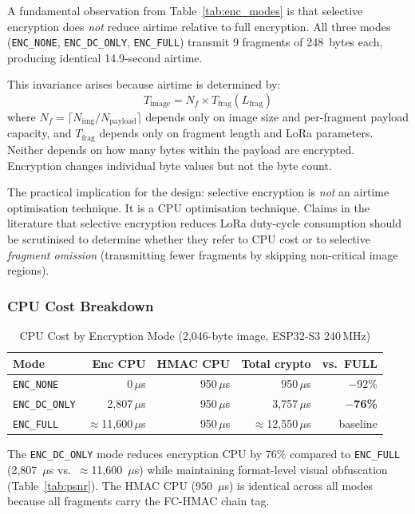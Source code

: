 \documentclass[journal]{IEEEtran}
\begin{document}
A fundamental observation from Table~\ref{tab:enc_modes} is that selective
encryption does \emph{not} reduce airtime relative to full encryption.  All
three modes (\texttt{ENC\_NONE}, \texttt{ENC\_DC\_ONLY}, \texttt{ENC\_FULL})
transmit 9 fragments of 248~bytes each, producing identical 14.9-second airtime.

This invariance arises because airtime is determined by:
\begin{equation}
  T_{\text{image}} = N_f \times T_{\text{frag}}(L_{\text{frag}})
  \label{eq:airtime}
\end{equation}
where $N_f = \lceil N_{\text{img}} / N_{\text{payload}} \rceil$ depends only
on image size and per-fragment payload capacity, and $T_{\text{frag}}$ depends
only on fragment length and LoRa parameters.  Neither depends on how many bytes
within the payload are encrypted.  Encryption changes individual byte values
but not the byte count.

The practical implication for the design: selective encryption is \emph{not}
an airtime optimisation technique.  It is a CPU optimisation technique.
Claims in the literature that selective encryption reduces LoRa duty-cycle
consumption should be scrutinised to determine whether they refer to CPU
cost or to selective \emph{fragment omission} (transmitting fewer fragments
by skipping non-critical image regions).

\subsubsection{CPU Cost Breakdown}

\begin{table}[ht]
\centering
\caption{CPU Cost by Encryption Mode (2{,}046-byte image, ESP32-S3 240\,MHz)}
\label{tab:cpu_savings}
\begin{tabular}{lrrrr}
\toprule
Mode & Enc CPU & HMAC CPU & Total crypto & vs.\ FULL \\
\midrule
\texttt{ENC\_NONE}    & 0\,$\mu$s & 950\,$\mu$s & 950\,$\mu$s & $-$92\% \\
\texttt{ENC\_DC\_ONLY}& 2{,}807\,$\mu$s & 950\,$\mu$s & 3{,}757\,$\mu$s & $-$\textbf{76\%} \\
\texttt{ENC\_FULL}    & $\approx$11{,}600\,$\mu$s & 950\,$\mu$s & $\approx$12{,}550\,$\mu$s & baseline \\
\bottomrule
\end{tabular}
\end{table}

The \texttt{ENC\_DC\_ONLY} mode reduces encryption CPU by 76\% compared to
\texttt{ENC\_FULL} (2{,}807~$\mu$s vs.\ $\approx$11{,}600~$\mu$s) while
maintaining format-level visual obfuscation (Table~\ref{tab:psnr}).  The HMAC
CPU (950~$\mu$s) is identical across all modes because all fragments carry the
FC-HMAC chain tag.
\end{document}
